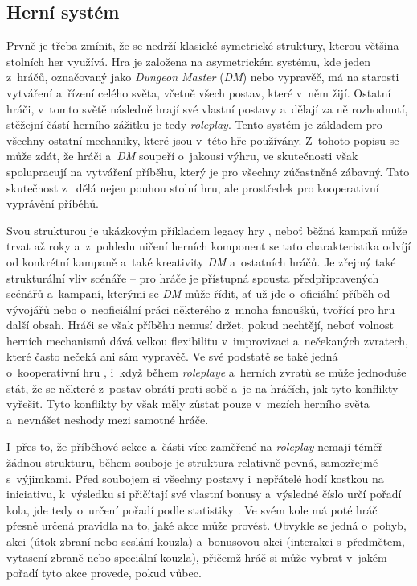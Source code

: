 \subsection{Herní systém}
\label{subsec:dnd_gameplay}

Prvně je třeba zmínit, že \dnd{} se nedrží klasické symetrické struktury, kterou většina stolních her využívá. Hra je založena na asymetrickém systému, kde jeden z~hráčů, označovaný jako \textit{Dungeon Master} (\textit{DM}) nebo vypravěč, má na starosti vytváření a~řízení celého světa, včetně všech postav, které v~něm žijí. Ostatní hráči, v~tomto světě následně hrají své vlastní postavy a~dělají za ně rozhodnutí, stěžejní částí herního zážitku je tedy \textit{roleplay}. Tento systém je základem pro všechny ostatní mechaniky, které jsou v~této hře používány. Z~tohoto popisu se může zdát, že hráči a~\textit{DM} soupeří o~jakousi výhru, ve skutečnosti však spolupracují na vytváření příběhu, který je pro všechny zúčastněné zábavný. Tato skutečnost z~\dnd{} dělá nejen pouhou stolní hru, ale prostředek pro kooperativní vyprávění příběhů.

Svou strukturou je \dnd{} ukázkovým příkladem legacy hry , neboť běžná kampaň může trvat až roky a~z~pohledu ničení herních komponent se tato charakteristika odvíjí od konkrétní kampaně a~také kreativity \textit{DM} a~ostatních hráčů. Je zřejmý také strukturální vliv scénáře  -- pro hráče je přístupná spousta předpřipravených scénářů a~kampaní, kterými se \textit{DM} může řídit, ať už jde o~oficiální příběh od vývojářů nebo o~neoficiální práci některého z~mnoha fanoušků, tvořící pro hru další obsah. Hráči se však příběhu nemusí držet, pokud nechtějí, neboť volnost herních mechanismů dává velkou flexibilitu v~improvizaci a~nečekaných zvratech, které často nečeká ani sám vypravěč. Ve své podstatě se také jedná o~kooperativní hru , i~když během \textit{roleplaye} a~herních zvratů se může jednoduše stát, že se některé z~postav obrátí proti sobě a~je na hráčích, jak tyto konflikty vyřešit. Tyto konflikty by však měly zůstat pouze v~mezích herního světa a~nevnášet neshody mezi samotné hráče.

I~přes to, že příběhové sekce a~části více zaměřené na \textit{roleplay} nemají téměř žádnou strukturu, během souboje je struktura relativně pevná, samozřejmě s~výjimkami. Před soubojem si všechny postavy i~nepřátelé hodí kostkou na iniciativu, k~výsledku si přičítají své vlastní bonusy a~výsledné číslo určí pořadí kola, jde tedy o~určení pořadí podle statistiky . Ve svém kole má poté hráč přesně určená pravidla na to, jaké akce může provést. Obvykle se jedná o~pohyb, akci (útok zbraní nebo seslání kouzla) a~bonusovou akci (interakci s~předmětem, vytasení zbraně nebo speciální kouzla), přičemž hráč si může vybrat v~jakém pořadí tyto akce provede, pokud vůbec. 


